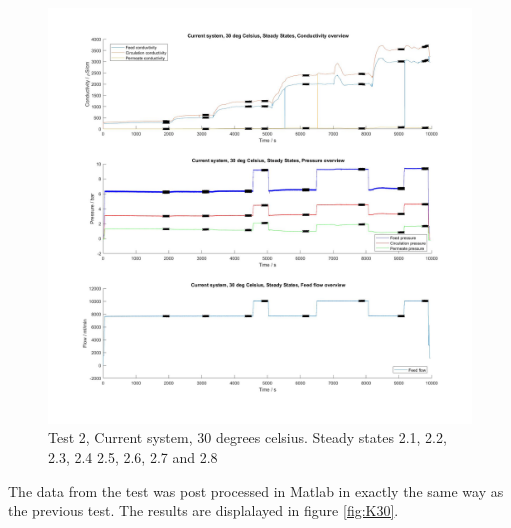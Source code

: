 \begin{figure}[H]
    \centering
    \includegraphics[width=1.1\textwidth]{overview30}
    \caption{Test 2, Current system, 30 degrees celsius. Steady states 2.1, 2.2, 2.3, 2.4 2.5, 2.6, 2.7 and 2.8}
    \label{fig:overw30}
\end{figure}

\newpage


The data from the test was post processed in Matlab in exactly the same way as the previous test. The results are displalayed in figure \ref{fig:K30}. 

